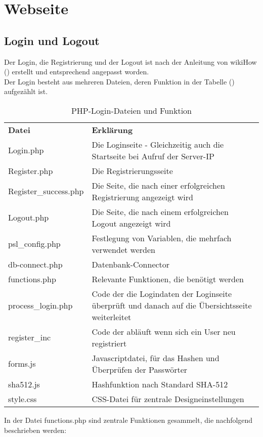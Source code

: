 \section{Webseite}
\subsection{Login und Logout}

Der Login, die Registrierung und der Logout ist nach der Anleitung von
wikiHow (\cite{PHP-Login}) erstellt und entsprechend angepasst worden. 
\\
Der Login besteht aus mehreren Dateien, deren Funktion in der Tabelle
() aufgezählt ist.

\begin{table}
\caption{PHP-Login-Dateien und Funktion}
\label{tab:Login-Dateien}
\begin{tabular}{p{} p{}}
\textbf{Datei} 				& \textbf{Erklärung} \\
Login.php 						& Die Loginseite - Gleichzeitig auch die Startseite bei Aufruf der Server-IP\\
Register.php 					& Die Registrierungsseite \\
Register\_success.php & Die Seite, die nach einer erfolgreichen Registrierung angezeigt wird \\
Logout.php 						& Die Seite, die nach einem erfolgreichen Logout angezeigt wird \\
psl\_config.php 			& Festlegung von Variablen, die mehrfach verwendet werden \\
db-connect.php 				& Datenbank-Connector \\
functions.php 				& Relevante Funktionen, die benötigt werden \\
process\_login.php 		& Code der die Logindaten der Loginseite überprüft und danach auf die Übersichtsseite weiterleitet \\
register\_inc 				& Code der abläuft wenn sich ein User neu registriert \\
forms.js 							& Javascriptdatei, für das Hashen und Überprüfen der Passwörter \\
sha512.js 						& Hashfunktion nach Standard SHA-512 \\
style.css 						& CSS-Datei für zentrale Designeinstellungen \\
 \end{tabular}
\end{table}

In der Datei functions.php sind zentrale Funktionen gesammelt, die nachfolgend
beschrieben werden:

